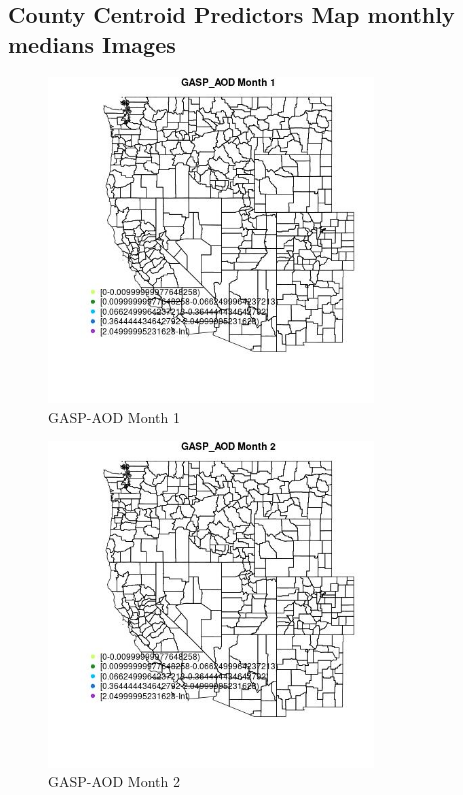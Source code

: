 
\subsection{County Centroid Predictors Map monthly medians Images} 
 

\begin{figure} 
\centering  
\includegraphics[width=0.77\textwidth]{Code_Outputs/df_report_ML_predictors_CountyCentroid_Locations_Dates_2008-01-01to2018-12-31_MapObsMo1GASP_AOD.jpg} 
\caption{\label{fig:df_report_ML_predictors_CountyCentroid_Locations_Dates_2008-01-01to2018-12-31MapObsMo1GASP_AOD}GASP-AOD Month 1} 
\end{figure} 
 

\begin{figure} 
\centering  
\includegraphics[width=0.77\textwidth]{Code_Outputs/df_report_ML_predictors_CountyCentroid_Locations_Dates_2008-01-01to2018-12-31_MapObsMo2GASP_AOD.jpg} 
\caption{\label{fig:df_report_ML_predictors_CountyCentroid_Locations_Dates_2008-01-01to2018-12-31MapObsMo2GASP_AOD}GASP-AOD Month 2} 
\end{figure} 
 

